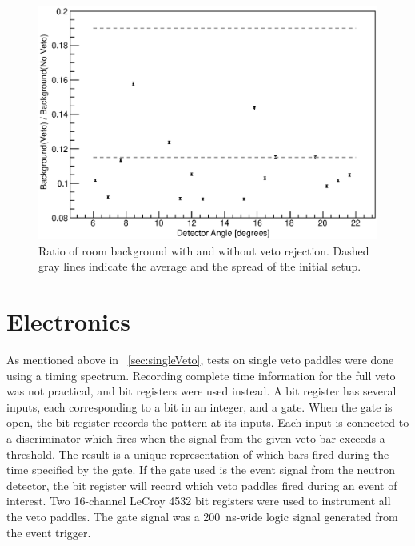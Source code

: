 \begin{figure}[!htbp]
\centering
\includegraphics[width=1.0\textwidth]{figures/bkgdRejection_new.eps}
\caption{Ratio of room background with and without veto rejection.  Dashed gray lines indicate the average and the spread of the initial setup.}
\label{fig:finalBackground}
\end{figure}

\section{Electronics}

As mentioned above in {\sect}~\ref{sec:singleVeto}, tests on single veto paddles were done using a timing spectrum.  Recording complete time information for the full veto was not practical, and bit registers were used instead.  A bit register has several inputs, each corresponding to a bit in an integer, and a gate.  When the gate is open, the bit register records the pattern at its inputs.  Each input is connected to a discriminator which fires when the signal from the given veto bar exceeds a threshold.  The result is a unique representation of which bars fired during the time specified by the gate.  If the gate used is the event signal from the neutron detector, the bit register will record which veto paddles fired during an event of interest.  Two 16-channel LeCroy 4532 bit registers were used to instrument all the veto paddles.  The gate signal was a 200~ns-wide logic signal generated from the event trigger.

